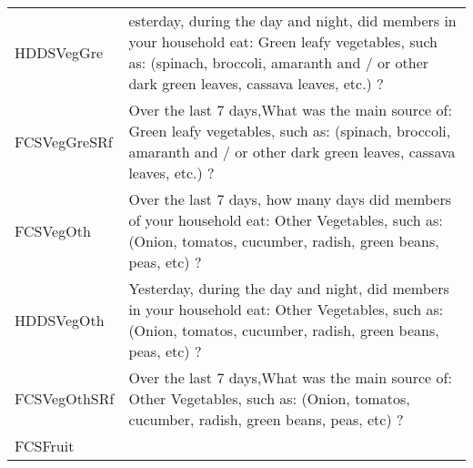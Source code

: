 \documentclass[
]{article}
\begin{document}
\begin{longtable}[]{@{}ll@{}}
\begin{minipage}[t]{0.22\columnwidth}
HDDSVegGre\strut
\end{minipage} & \begin{minipage}[t]{0.72\columnwidth}\raggedright
esterday, during the day and night, did members in your household eat: Green leafy vegetables, such as: (spinach, broccoli, amaranth and / or other dark green leaves, cassava leaves, etc.) ?\strut
\end{minipage}\tabularnewline
\begin{minipage}[t]{0.22\columnwidth}\raggedright
FCSVegGreSRf\strut
\end{minipage} & \begin{minipage}[t]{0.72\columnwidth}\raggedright
Over the last 7 days,What was the main source of: Green leafy vegetables, such as: (spinach, broccoli, amaranth and / or other dark green leaves, cassava leaves, etc.) ?\strut
\end{minipage}\tabularnewline
\begin{minipage}[t]{0.22\columnwidth}\raggedright
FCSVegOth\strut
\end{minipage} & \begin{minipage}[t]{0.72\columnwidth}\raggedright
Over the last 7 days, how many days did members of your household eat: Other Vegetables, such as: (Onion, tomatos, cucumber, radish, green beans, peas, etc) ?\strut
\end{minipage}\tabularnewline
\begin{minipage}[t]{0.22\columnwidth}\raggedright
HDDSVegOth\strut
\end{minipage} & \begin{minipage}[t]{0.72\columnwidth}\raggedright
Yesterday, during the day and night, did members in your household eat: Other Vegetables, such as: (Onion, tomatos, cucumber, radish, green beans, peas, etc) ?\strut
\end{minipage}\tabularnewline
\begin{minipage}[t]{0.22\columnwidth}\raggedright
FCSVegOthSRf\strut
\end{minipage} & \begin{minipage}[t]{0.72\columnwidth}\raggedright
Over the last 7 days,What was the main source of: Other Vegetables, such as: (Onion, tomatos, cucumber, radish, green beans, peas, etc) ?\strut
\end{minipage}\tabularnewline
\begin{minipage}[t]{0.22\columnwidth}\raggedright
FCSFruit\strut
\end{minipage} & \begin{minipage}[t]{0.72\columnwidth}\raggedright

\end{minipage}
\end{longtable}
\end{document}
